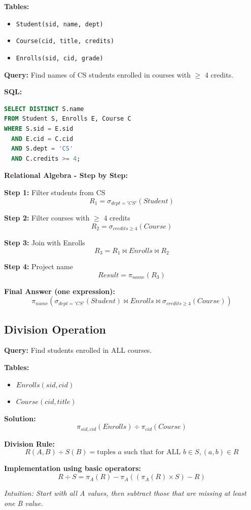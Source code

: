 \begin{examplebox}
\textbf{Tables:}
\begin{itemize}
    \item \texttt{Student(sid, name, dept)}
    \item \texttt{Course(cid, title, credits)}
    \item \texttt{Enrolls(sid, cid, grade)}
\end{itemize}

\textbf{Query:} Find names of CS students enrolled in courses with $\geq$ 4 credits.

\textbf{SQL:}
\begin{lstlisting}[language=SQL]
SELECT DISTINCT S.name
FROM Student S, Enrolls E, Course C
WHERE S.sid = E.sid
  AND E.cid = C.cid
  AND S.dept = 'CS'
  AND C.credits >= 4;
\end{lstlisting}

\textbf{Relational Algebra - Step by Step:}

\textbf{Step 1:} Filter students from CS
\[
R_1 = \sigma_{dept='CS'}(Student)
\]

\textbf{Step 2:} Filter courses with $\geq$ 4 credits
\[
R_2 = \sigma_{credits \geq 4}(Course)
\]

\textbf{Step 3:} Join with Enrolls
\[
R_3 = R_1 \bowtie Enrolls \bowtie R_2
\]

\textbf{Step 4:} Project name
\[
Result = \pi_{name}(R_3)
\]

\textbf{Final Answer (one expression):}
\[
\pi_{name}(\sigma_{dept='CS'}(Student) \bowtie Enrolls \bowtie \sigma_{credits \geq 4}(Course))
\]
\end{examplebox}

\subsection{Division Operation}

\begin{examplebox}
\textbf{Query:} Find students enrolled in ALL courses.

\textbf{Tables:}
\begin{itemize}
    \item $Enrolls(sid, cid)$
    \item $Course(cid, title)$
\end{itemize}

\textbf{Solution:}
\[
\pi_{sid, cid}(Enrolls) \div \pi_{cid}(Course)
\]

\textbf{Division Rule:}
\[
R(A, B) \div S(B) = \text{tuples } a \text{ such that for ALL } b \in S, (a,b) \in R
\]

\textbf{Implementation using basic operators:}
\[
R \div S = \pi_A(R) - \pi_A\left((\pi_A(R) \times S) - R\right)
\]

\textit{Intuition: Start with all A values, then subtract those that are missing at least one B value.}
\end{examplebox}

